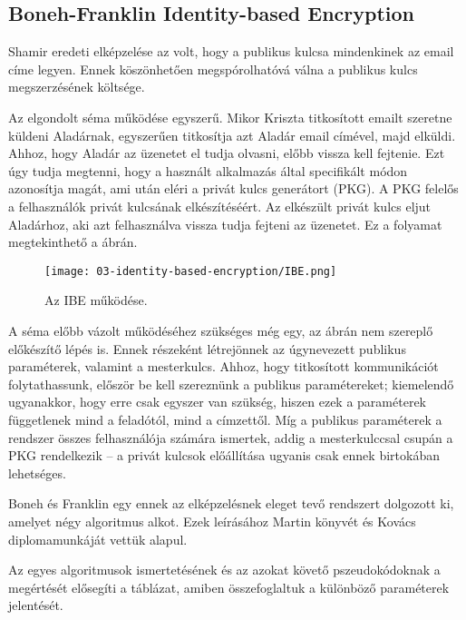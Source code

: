 \subsection{Boneh-Franklin Identity-based Encryption}

Shamir eredeti elképzelése az volt, hogy a publikus kulcsa mindenkinek az email címe legyen. Ennek köszönhetően megspórolhatóvá válna a publikus kulcs megszerzésének költsége.

Az elgondolt séma működése egyszerű. Mikor Kriszta titkosított emailt szeretne küldeni Aladárnak, egyszerűen titkosítja azt Aladár email címével, majd elküldi. Ahhoz, hogy Aladár az üzenetet el tudja olvasni, előbb vissza kell fejtenie. Ezt úgy tudja megtenni, hogy a használt alkalmazás által specifikált módon azonosítja magát, ami után eléri a privát kulcs generátort (PKG). A PKG felelős a felhasználók privát kulcsának elkészítéséért. Az elkészült privát kulcs eljut Aladárhoz, aki azt felhasználva vissza tudja fejteni az üzenetet. Ez a folyamat megtekinthető a  ábrán.

\begin{figure}[H]
    \centering
    \texttt{[image: 03-identity-based-encryption/IBE.png]}
    \caption{Az IBE működése.}
    \label{Figure::ShamirIBE}
\end{figure}

A séma előbb vázolt működéséhez szükséges még egy, az ábrán nem szereplő előkészítő lépés is. Ennek részeként létrejönnek az úgynevezett publikus paraméterek, valamint a mesterkulcs. Ahhoz, hogy titkosított kommunikációt folytathassunk, először be kell szereznünk a publikus paramétereket; kiemelendő ugyanakkor, hogy erre csak egyszer van szükség, hiszen ezek a paraméterek függetlenek mind a feladótól, mind a címzettől. Míg a publikus paraméterek a rendszer összes felhasználója számára ismertek, addig a mesterkulccsal csupán a PKG rendelkezik  – a privát kulcsok előállítása ugyanis csak ennek birtokában lehetséges.

Boneh és Franklin egy ennek az elképzelésnek eleget tevő rendszert dolgozott ki, amelyet négy algoritmus alkot. Ezek leírásához Martin könyvét \citeyear{Martin::IntroductionToIdentityBasedEncryption} és Kovács diplomamunkáját \citeyear{Kovacs::IBE} vettük alapul.

Az egyes algoritmusok ismertetésének és az azokat követő pszeudokódoknak a megértését elősegíti a  táblázat, amiben összefoglaltuk a különböző paraméterek jelentését.

